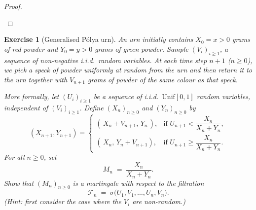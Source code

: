\documentclass{article}
\newtheorem{exercise}[theorem]{Exercise}
\begin{document}
\begin{proof}
\begin{enumerate}
\end{enumerate}
\end{proof}

\begin{exercise}[Generalised Pólya urn]
An urn initially contains $X_0 = x > 0$ grams of red powder and $Y_0 = y > 0$ grams of green powder.  Sample $(V_i)_{i\ge1}$, a sequence of non-negative i.i.d.\ random variables.  At each time step $n+1$ ($n\ge0$), we pick a speck of powder uniformly at random from the urn and then return it to the urn together with $V_{n+1}$ grams of powder of the same colour as that speck.

More formally, let $(U_i)_{i\ge1}$ be a sequence of i.i.d.\ $\mathrm{Unif}[0,1]$ random variables, independent of $(V_i)_{i\ge1}$.  Define $(X_n)_{n\ge0}$ and $(Y_n)_{n\ge0}$ by
\[
  (X_{n+1},Y_{n+1})
  = 
  \begin{cases}
    (\,X_n + V_{n+1},\,Y_n\,), 
      &\text{if } U_{n+1} < \dfrac{X_n}{X_n + Y_n}, \\[1em]
    (\,X_n,\,Y_n + V_{n+1}), 
      &\text{if } U_{n+1} \ge \dfrac{X_n}{X_n + Y_n}.
  \end{cases}
\]
For all $n\ge0$, set
\[
  M_n \;=\; \frac{X_n}{X_n + Y_n}.
\]
Show that $(M_n)_{n\ge0}$ is a martingale with respect to the filtration
\[
  \mathcal{F}_n \;=\;\sigma\bigl(U_1,V_1,\dots,U_n,V_n\bigr).
\]
\emph{(Hint: first consider the case where the $V_i$ are non-random.)}
\end{exercise}
\end{document}
